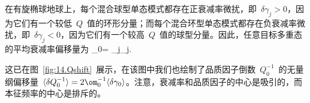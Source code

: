 在有旋椭球地球上，每个混合球型单态模式都存在正衰减率微扰，即~$\delta\gamma_j>0$，因为它们有一个较低~$Q$~值的环形分量；而每个混合环型单态模式都存在负衰减率微扰，即~$\delta\gamma_j<0$，因为它们有一个较高~$Q$~值的球型分量。因此，任意目标多重态的平均衰减率偏移量为
\eq \label{14.shift2}
\langle\delta\gamma_0\rangle=
\sum_j\delta\gamma_j.
\en

这已在图~\ref{fig:14.Qshift}~展示，在该图中我们也绘制了品质因子倒数~$Q_0^{-1}$~的无量纲偏移量~$\langle\delta Q_0^{-1}
\rangle=2\om_0^{-1}\langle\delta\gamma_0\rangle$。注意，衰减率和品质因子的中心是吸引的，而本征频率的中心是排斥的。

